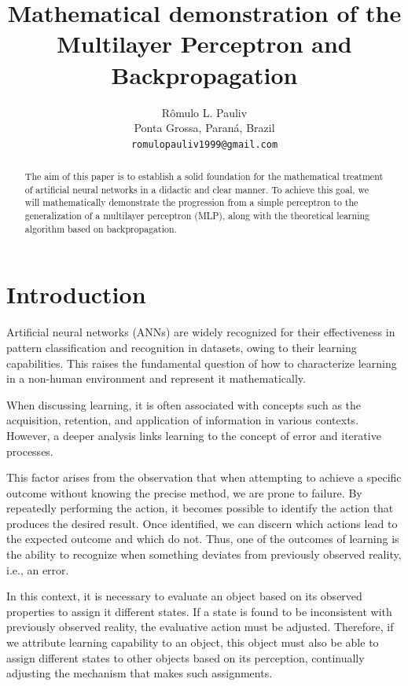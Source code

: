 \documentclass{article}
\title{Mathematical demonstration of the Multilayer Perceptron and Backpropagation}
\author{
 Rômulo L. Pauliv \\
  Ponta Grossa, Paraná, Brazil\\
  \texttt{romulopauliv1999@gmail.com} \\
}
\begin{document}
\maketitle
\begin{abstract}
  The aim of this paper is to establish a solid foundation for the mathematical treatment of artificial neural networks in a didactic and clear manner. To achieve this goal, we will mathematically demonstrate the progression from a simple perceptron to the generalization of a multilayer perceptron (MLP), along with the theoretical learning algorithm based on backpropagation.
\end{abstract}




\section{Introduction}
Artificial neural networks (ANNs) are widely recognized for their effectiveness in pattern classification and recognition in datasets, owing to their learning capabilities. This raises the fundamental question of how to characterize learning in a non-human environment and represent it mathematically.

When discussing learning, it is often associated with concepts such as the acquisition, retention, and application of information in various contexts. However, a deeper analysis links learning to the concept of error and iterative processes.

This factor arises from the observation that when attempting to achieve a specific outcome without knowing the precise method, we are prone to failure. By repeatedly performing the action, it becomes possible to identify the action that produces the desired result. Once identified, we can discern which actions lead to the expected outcome and which do not. Thus, one of the outcomes of learning is the ability to recognize when something deviates from previously observed reality, i.e., an error.

In this context, it is necessary to evaluate an object based on its observed properties to assign it different states. If a state is found to be inconsistent with previously observed reality, the evaluative action must be adjusted. Therefore, if we attribute learning capability to an object, this object must also be able to assign different states to other objects based on its perception, continually adjusting the mechanism that makes such assignments.
\end{document}
